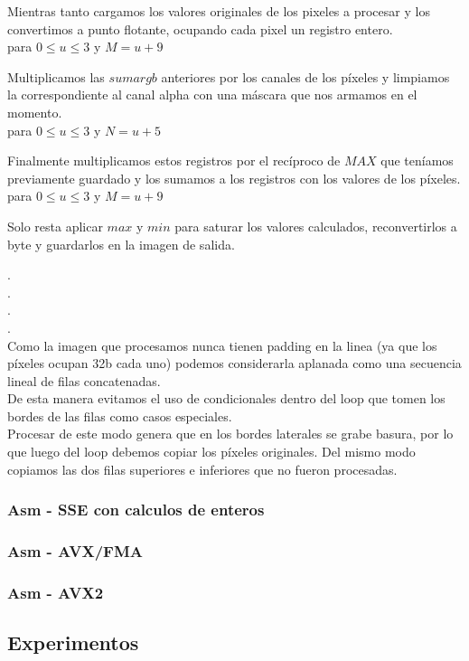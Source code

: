 Mientras tanto cargamos los valores originales de los pixeles a procesar y los convertimos a punto flotante, ocupando cada pixel un registro entero. \\

 
para $0 \le u \le 3$ y $M = u+9$

Multiplicamos las $sumargb$ anteriores por los canales de los píxeles y limpiamos la correspondiente al canal alpha con una máscara que nos armamos en el momento. \\

 
para $0 \le u \le 3$ y $N = u+5$

Finalmente multiplicamos estos registros por el recíproco de $MAX$ que teníamos previamente guardado y los sumamos a los registros con los valores de los píxeles. \\

 
para $0 \le u \le 3$ y $M = u+9$

Solo resta aplicar $max$ y $min$ para saturar los valores calculados, reconvertirlos a byte y guardarlos en la imagen de salida.

.\\
.\\
.\\
.\\

Como la imagen que procesamos nunca tienen padding en la linea (ya que los píxeles ocupan 32b cada uno) podemos considerarla aplanada como una secuencia lineal de filas concatenadas. \\
De esta manera evitamos el uso de condicionales dentro del loop que tomen los bordes de las filas como casos especiales. \\
Procesar de este modo genera que en los bordes laterales se grabe basura, por lo que luego del loop debemos copiar los píxeles originales.
Del mismo modo copiamos las dos filas superiores e inferiores que no fueron procesadas.


\subsubsection{Asm - SSE con calculos de enteros}

\cite{hackersdelight}

\subsubsection{Asm - AVX/FMA}

\subsubsection{Asm - AVX2}

\subsection{Experimentos}

